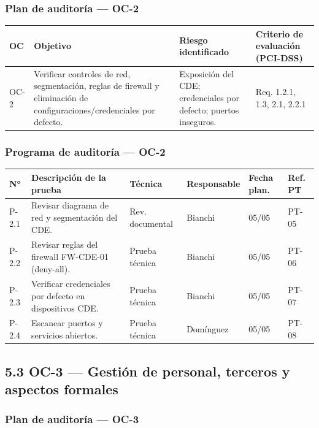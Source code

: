 \documentclass[11pt,a4paper]{article}
\begin{document}
\subsubsection{Plan de auditoría — OC-2}

\begin{tabularx}{\textwidth}{P{2.5cm}P{3cm}P{2.5cm}L}
\toprule
\textbf{OC} & \textbf{Objetivo} & \textbf{Riesgo identificado} & \textbf{Criterio de evaluación (PCI-DSS)} \\
\midrule
OC-2 & Verificar controles de red, segmentación, reglas de firewall y eliminación de configuraciones/credenciales por defecto. & Exposición del CDE; credenciales por defecto; puertos inseguros. & Req. 1.2.1, 1.3, 2.1, 2.2.1 \\
\bottomrule
\end{tabularx}

\subsubsection{Programa de auditoría — OC-2}

\begin{tabularx}{\textwidth}{P{1.8cm}P{2cm}P{3cm}P{2cm}P{1.5cm}L}
\toprule
\textbf{N°} & \textbf{Descripción de la prueba} & \textbf{Técnica} & \textbf{Responsable} & \textbf{Fecha plan.} & \textbf{Ref. PT} \\
\midrule
P-2.1 & Revisar diagrama de red y segmentación del CDE. & Rev. documental & Bianchi & 05/05 & PT-05 \\
P-2.2 & Revisar reglas del firewall FW-CDE-01 (deny-all). & Prueba técnica & Bianchi & 05/05 & PT-06 \\
P-2.3 & Verificar credenciales por defecto en dispositivos CDE. & Prueba técnica & Bianchi & 05/05 & PT-07 \\
P-2.4 & Escanear puertos y servicios abiertos. & Prueba técnica & Domínguez & 05/05 & PT-08 \\
\bottomrule
\end{tabularx}

\subsection{5.3 OC-3 — Gestión de personal, terceros y aspectos formales}

\subsubsection{Plan de auditoría — OC-3}
\end{document}
